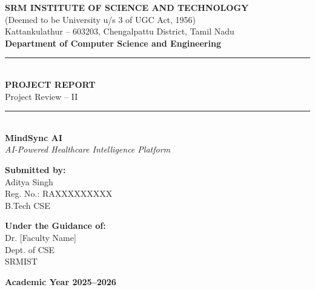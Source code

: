 \documentclass[12pt,a4paper]{report}
\begin{document}
\begin{titlepage}
    \begin{center}
        \vspace*{0.5cm}

        {\Large\textbf{\textcolor{srmblue}{SRM INSTITUTE OF SCIENCE AND TECHNOLOGY}}}\\[0.3cm]
        {\large (Deemed to be University u/s 3 of UGC Act, 1956)}\\[0.2cm]
        {\large Kattankulathur -- 603203, Chengalpattu District, Tamil Nadu}\\[0.8cm]

        {\large\textbf{Department of Computer Science and Engineering}}\\[1.5cm]

        \rule{\textwidth}{1pt}\\[0.5cm]
        {\LARGE\textbf{\textcolor{srmblue}{PROJECT REPORT}}}\\[0.3cm]
        {\large Project Review -- II}\\[0.5cm]
        \rule{\textwidth}{1pt}\\[1.5cm]

        {\Huge\textbf{\textcolor{srmblue}{MindSync AI}}}\\[0.5cm]
        {\Large\textit{AI-Powered Healthcare Intelligence Platform}}\\[2cm]

        \begin{minipage}[t]{0.45\textwidth}
            \begin{flushleft}
                \textbf{Submitted by:}\\[0.3cm]
                Aditya Singh\\
                Reg. No.: RAXXXXXXXXX\\
                B.Tech CSE
            \end{flushleft}
        \end{minipage}
        \hfill
        \begin{minipage}[t]{0.45\textwidth}
            \begin{flushright}
                \textbf{Under the Guidance of:}\\[0.3cm]
                Dr. [Faculty Name]\\
                Dept. of CSE\\
                SRMIST
            \end{flushright}
        \end{minipage}

        \vfill
        {\large\textbf{Academic Year 2025--2026}}

    \end{center}
\end{titlepage}
\end{document}
